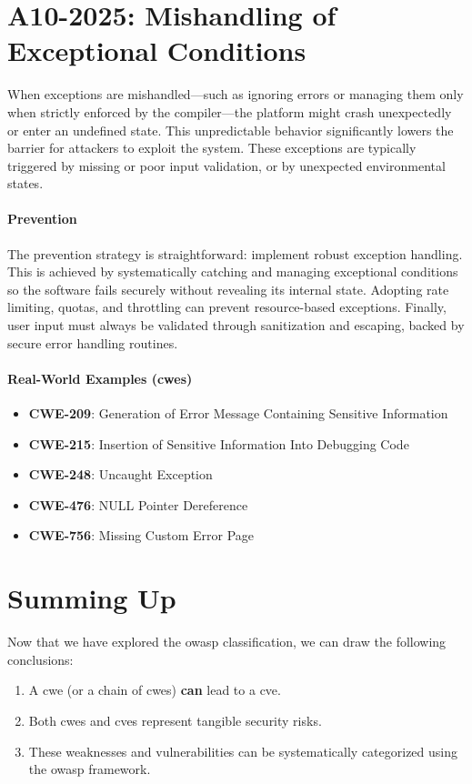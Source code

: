 \section{A10-2025: Mishandling of Exceptional Conditions}
When exceptions are mishandled—such as ignoring errors or managing them only when strictly enforced by the compiler—the platform might crash unexpectedly or enter an undefined state. This unpredictable behavior significantly lowers the barrier for attackers to exploit the system. These exceptions are typically triggered by missing or poor input validation, or by unexpected environmental states.

\paragraph{Prevention} The prevention strategy is straightforward: implement robust exception handling. This is achieved by systematically catching and managing exceptional conditions so the software fails securely without revealing its internal state. Adopting rate limiting, quotas, and throttling can prevent resource-based exceptions. Finally, user input must always be validated through sanitization and escaping, backed by secure error handling routines.

\paragraph{Real-World Examples (\glspl{cwe})}
\begin{itemize}
    \item \textbf{CWE-209}: Generation of Error Message Containing Sensitive Information
    \item \textbf{CWE-215}: Insertion of Sensitive Information Into Debugging Code
    \item \textbf{CWE-248}: Uncaught Exception
    \item \textbf{CWE-476}: NULL Pointer Dereference
    \item \textbf{CWE-756}: Missing Custom Error Page
\end{itemize}

\section{Summing Up}
Now that we have explored the \gls{owasp} classification, we can draw the following conclusions:
\begin{enumerate}
    \item A \gls{cwe} (or a chain of \glspl{cwe}) \textbf{can} lead to a \gls{cve}.
    \item Both \glspl{cwe} and \glspl{cve} represent tangible security risks.
    \item These weaknesses and vulnerabilities can be systematically categorized using the \gls{owasp} framework.
\end{enumerate}

